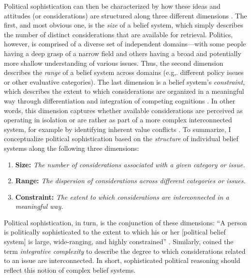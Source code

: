 Political sophistication can then be characterized by how these ideas and attitudes (or considerations) are structured along three different dimensions \citep{luskin1987measuring}. The first, and most obvious one, is the \textit{size} of a belief system, which simply describes the number of distinct considerations that are available for retrieval. Politics, however, is comprised of a diverse set of independent domains---with some people having a deep grasp of a narrow field and others having a broad and potentially more shallow understanding of various issues. Thus, the second dimension describes the \textit{range} of a belief system across domains (e.g,. different policy issues or other evaluative categories). The last dimension is a belief system's \textit{constraint}, which describes the extent to which considerations are organized in a meaningful way through differentiation and integration of competing cognitions \citep{luskin1987measuring}. In other words, this dimension captures whether available considerations are perceived as operating in isolation or are rather as part of a more complex interconnected system, for example by identifying inherent value conflicts \citep{tetlock1983cognitive,tetlock1993cognitive}. To summarize, I conceptualize political sophistication based on the \textit{structure} of individual belief systems along the following three dimensions:

\begin{enumerate}
	\item \textbf{Size:} \textit{The number of considerations associated with a given category or issue.}
	\item \textbf{Range:} \textit{The dispersion of considerations across different categories or issues.}
	\item \textbf{Constraint:} \textit{The extent to which considerations are interconnected in a meaningful way.}
\end{enumerate}

Political sophistication, in turn, is the conjunction of these dimensions: ``A person is politically sophisticated to the extent to which his or her [political belief system] is large, wide-ranging, and highly constrained'' \citep[860]{luskin1987measuring}. Similarly, \citet{tetlock1983cognitive,tetlock1993cognitive} coined the term \textsl{integrative complexity} to describe the degree to which considerations related to an issue are interconnected. In short, sophisticated political reasoning should reflect this notion of complex belief systems.

